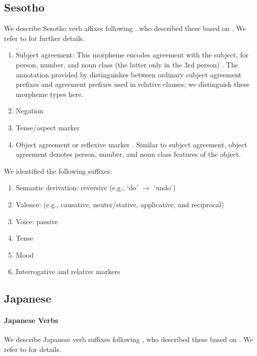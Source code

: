 \documentclass[11pt,letterpaper]{article}
\begin{document}
\subsection{Sesotho}

We describe Sesotho verb affixes following \cite{Hahn2020modeling}.
who described these based on \citep{doke1967textbook, guma1971outline, demuth1992acquisition}.
We refer to \cite{Hahn2020modeling} for further details.

\begin{enumerate}
    \item Subject agreement: This morpheme encodes agreement with the subject, for person, number, and noun class (the latter only in the 3rd person) \cite[]{doke1967textbook}.
            The annotation provided by \cite{demuth1992acquisition} distinguishes between ordinary subject agreement prefixes and agreement prefixes used in relative clauses; we distinguish these morpheme types here.

    \item Negation \citep[]{doke1967textbook}

    \item Tense/aspect marker   \citep[--424]{doke1967textbook}

    \item Object agreement or reflexive marker \citep[]{doke1967textbook}.
    Similar to subject agreement, object agreement denotes person, number, and noun class features of the object.
\end{enumerate}
We identified the following suffixes:

\begin{enumerate}
\item Semantic derivation: reversive (e.g., `do' $\rightarrow$ `undo')
\item Valence: (e.g., causative, neuter/stative, applicative, and reciprocal)
    \item Voice: passive
    \item Tense
    \item Mood
    \item Interrogative and relative markers
\end{enumerate}

\subsection{Japanese}

\paragraph{Japanese Verbs}
We describe Japanese verb suffixes following \citep{Hahn2020modeling}, who described these based on \citep{kaiser2013japanese,hasegawa2014japanese}.
We refer to \citep{Hahn2020modeling} for details.
\end{document}
